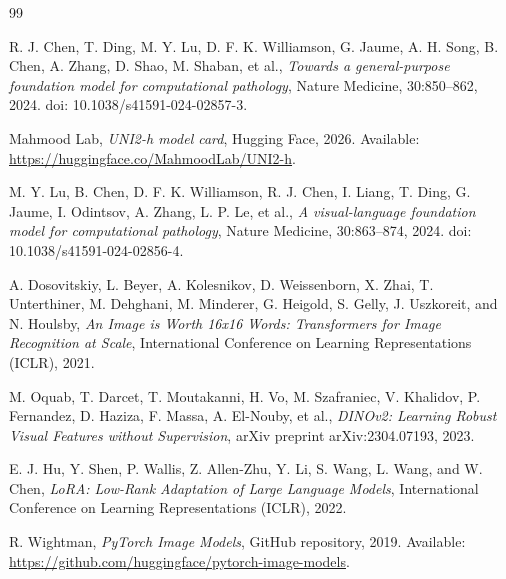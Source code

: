\documentclass[a4paper,12pt]{article}
\begin{document}
\begin{thebibliography}{99}

R. J. Chen, T. Ding, M. Y. Lu, D. F. K. Williamson, G. Jaume, A. H. Song, B. Chen, A. Zhang, D. Shao, M. Shaban, et al.,
\emph{Towards a general-purpose foundation model for computational pathology},
Nature Medicine, 30:850--862, 2024. doi: 10.1038/s41591-024-02857-3.

Mahmood Lab,
\emph{UNI2-h model card},
Hugging Face, 2026. Available: \url{https://huggingface.co/MahmoodLab/UNI2-h}.

M. Y. Lu, B. Chen, D. F. K. Williamson, R. J. Chen, I. Liang, T. Ding, G. Jaume, I. Odintsov, A. Zhang, L. P. Le, et al.,
\emph{A visual-language foundation model for computational pathology},
Nature Medicine, 30:863--874, 2024. doi: 10.1038/s41591-024-02856-4.

A. Dosovitskiy, L. Beyer, A. Kolesnikov, D. Weissenborn, X. Zhai, T. Unterthiner, M. Dehghani, M. Minderer, G. Heigold, S. Gelly, J. Uszkoreit, and N. Houlsby,
\emph{An Image is Worth 16x16 Words: Transformers for Image Recognition at Scale},
International Conference on Learning Representations (ICLR), 2021.

M. Oquab, T. Darcet, T. Moutakanni, H. Vo, M. Szafraniec, V. Khalidov, P. Fernandez, D. Haziza, F. Massa, A. El-Nouby, et al.,
\emph{DINOv2: Learning Robust Visual Features without Supervision},
arXiv preprint arXiv:2304.07193, 2023.

E. J. Hu, Y. Shen, P. Wallis, Z. Allen-Zhu, Y. Li, S. Wang, L. Wang, and W. Chen,
\emph{LoRA: Low-Rank Adaptation of Large Language Models},
International Conference on Learning Representations (ICLR), 2022.

R. Wightman,
\emph{PyTorch Image Models},
GitHub repository, 2019. Available: \url{https://github.com/huggingface/pytorch-image-models}.

\end{thebibliography}
\end{document}
